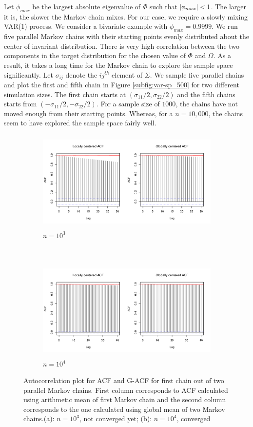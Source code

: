 \documentclass[11pt]{article}
\theoremstyle{remark}
\begin{document}
Let $\phi_{max}$ be the largest absolute eigenvalue of $\Phi$ such that $\abs{\phi_{max}} < 1$. The larger it is, the slower the Markov chain mixes. For our case, we require a slowly mixing VAR(1) process. We consider a bivariate example with $\phi_{max} = 0.9999$. We run five parallel Markov chains with their starting points evenly distributed about the center of invariant distribution. There is very high correlation between the two components in the target distribution for the chosen value of $\Phi$ and $\Omega$. As a result, it takes a long time for the Markov chain to explore the sample space significantly. Let $\sigma_{ij}$ denote the $ij^{th}$ element of $\Sigma$. We sample five parallel chains and plot the first and fifth chain in Figure \ref{subfig:var-sp_500} for two different simulation sizes. The first chain starts at $(\sigma_{11}/2, \sigma_{22}/2)$ and the fifth chains starts from $(-\sigma_{11}/2, -\sigma_{22}/2)$. For a sample size of $1000$, the chains have not moved enough from their starting points. Whereas, for a $n = 10,000$, the chains seem to have explored the sample space fairly well.\\

\begin{figure}[h]
 \begin{subfigure}[h]{\textwidth}
   \centering
   \includegraphics[width=.7\linewidth, height = 2in]{plots/var-acf_n1000.pdf}
   \caption{$n = 10^3$}
   \label{subfig:var-acf_n1e3}
\end{subfigure}\\
\begin{subfigure}[h]{\textwidth}
  \centering
  \includegraphics[width=.7\linewidth, height = 2in]{plots/var-acf_n10000.pdf} 
  \caption{$n = 10^4$}
  \label{subfig:var-acf_n1e5}
\end{subfigure}

\caption{Autocorrelation plot for ACF and G-ACF for first chain out of two parallel Markov chains. First column corresponds to ACF calculated using arithmetic mean of first Markov chain and the second column corresponds to the one calculated using global mean of two Markov chains.(a): $n = 10^3$, not converged yet; (b): $n =  10^4$, converged}
\label{fig:var-acf}
\end{figure}
\end{document}
